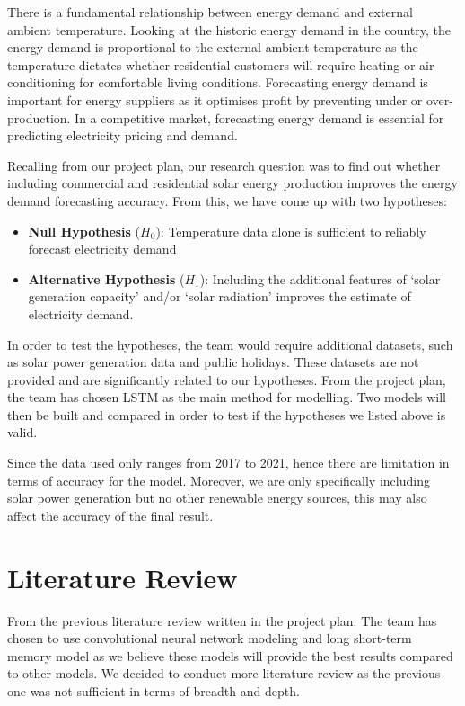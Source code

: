 \documentclass[
]{article}
\begin{document}
There is a fundamental relationship between energy demand and external
ambient temperature. Looking at the historic energy demand in the
country, the energy demand is proportional to the external ambient
temperature as the temperature dictates whether residential customers
will require heating or air conditioning for comfortable living
conditions. Forecasting energy demand is important for energy suppliers
as it optimises profit by preventing under or over-production. In a
competitive market, forecasting energy demand is essential for
predicting electricity pricing and demand.

Recalling from our project plan, our research question was to find out
whether including commercial and residential solar energy production
improves the energy demand forecasting accuracy. From this, we have come
up with two hypotheses:

\begin{itemize}
\item
  \textbf{Null Hypothesis} (\(H_0\)): Temperature data alone is
  sufficient to reliably forecast electricity demand
\item
  \textbf{Alternative Hypothesis} (\(H_1\)): Including the additional
  features of `solar generation capacity' and/or `solar radiation'
  improves the estimate of electricity demand.
\end{itemize}

In order to test the hypotheses, the team would require additional
datasets, such as solar power generation data and public holidays. These
datasets are not provided and are significantly related to our
hypotheses. From the project plan, the team has chosen LSTM as the main
method for modelling. Two models will then be built and compared in
order to test if the hypotheses we listed above is valid.

Since the data used only ranges from 2017 to 2021, hence there are
limitation in terms of accuracy for the model. Moreover, we are only
specifically including solar power generation but no other renewable
energy sources, this may also affect the accuracy of the final result.

\section{Literature Review}\label{literature-review}

From the previous literature review written in the project plan. The
team has chosen to use convolutional neural network modeling and long
short-term memory model as we believe these models will provide the best
results compared to other models. We decided to conduct more literature
review as the previous one was not sufficient in terms of breadth and
depth.
\end{document}
